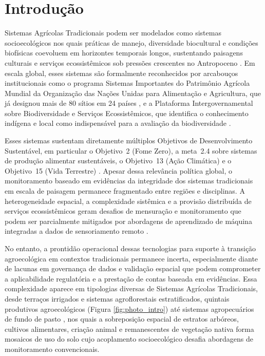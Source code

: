\documentclass[lineno,pdflatex,sn-apa]{sn-jnl}%
\begin{document}

\maketitle

\section[Introdução]{Introdução}

Sistemas Agrícolas Tradicionais podem ser modelados como sistemas socioecológicos nos quais práticas de manejo, diversidade biocultural e condições biofísicas coevoluem em horizontes temporais longos, sustentando paisagens culturais e serviços ecossistêmicos sob pressões crescentes no Antropoceno \citep{Berkes2003}. Em escala global, esses sistemas são formalmente reconhecidos por arcabouços institucionais como o programa Sistemas Importantes do Patrimônio Agrícola Mundial da Organização das Nações Unidas para Alimentação e Agricultura, que já designou mais de 80 sítios em 24 países \citep{Koohafkan2011}, e a Plataforma Intergovernamental sobre Biodiversidade e Serviços Ecossistêmicos, que identifica o conhecimento indígena e local como indispensável para a avaliação da biodiversidade \citep{IPBES2019}.

Esses sistemas sustentam diretamente múltiplos Objetivos de Desenvolvimento Sustentável, em particular o Objetivo~2 (Fome Zero), a meta~2.4 sobre sistemas de produção alimentar sustentáveis, o Objetivo~13 (Ação Climática) e o Objetivo~15 (Vida Terrestre) \citep{UN2015}. Apesar dessa relevância política global, o monitoramento baseado em evidências da integridade dos sistemas tradicionais em escala de paisagem permanece fragmentado entre regiões e disciplinas. A heterogeneidade espacial, a complexidade sistêmica e a provisão distribuída de serviços ecossistêmicos geram desafios de mensuração e monitoramento que podem ser parcialmente mitigados por abordagens de aprendizado de máquina integradas a dados de sensoriamento remoto \citep{Weiss2020,Osco2021}. 

No entanto, a prontidão operacional dessas tecnologias para suporte à transição agroecológica em contextos tradicionais permanece incerta, especialmente diante de lacunas em governança de dados e validação espacial que podem comprometer a aplicabilidade regulatória e a prestação de contas baseada em evidências. Essa complexidade aparece em tipologias diversas de Sistemas Agrícolas Tradicionais, desde terraços irrigados e sistemas agroflorestais estratificados, quintais produtivos agroecológicos (Figura \ref{fig:photo_intro}) até sistemas agropecuários de fundo de pasto \citep{Koohafkan2011,Altieri2004}, nos quais a sobreposição espacial de estratos arbóreos, cultivos alimentares, criação animal e remanescentes de vegetação nativa forma mosaicos de uso do solo cujo acoplamento socioecológico desafia abordagens de monitoramento convencionais.
\end{document}
